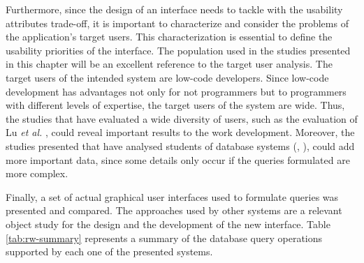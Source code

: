 Furthermore, since the design of an interface needs to tackle with the usability attributes trade-off, it is important to characterize and consider the problems of the application's target users. This characterization is essential to define the usability priorities of the interface. The population used in the studies presented in this chapter will be an excellent reference to the target user analysis. The target users of the intended system are low-code developers. Since low-code development has advantages not only for not programmers but to programmers with different levels of expertise, the target users of the system are wide. Thus, the studies that have evaluated a wide diversity of users, such as the evaluation of Lu \textit{et al.} \cite{aSurveyOnUsageOfSQL}, could reveal important results to the work development. Moreover, the studies presented that have analysed students of database systems (\cite{studentsSemanticMistakesInWritingSevenDifferentTypesOfSQLQueries}, \cite{errorsAndComplicationsInSQLQueryFormulation}), could add more important data, since some details only occur if the queries formulated are more complex.

Finally, a set of actual graphical user interfaces used to formulate queries was presented and compared. The approaches used by other systems are a relevant object study for the design and the development of the new interface. Table \ref{tab:rw-summary} represents a summary of the database query operations supported by each one of the presented systems.

